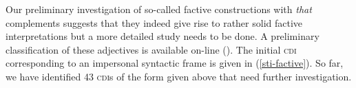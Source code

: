 \documentclass[10pt]{article}
\begin{document}
Our preliminary investigation of so-called factive constructions with \textit{that} complements suggests that 
they indeed give rise to rather solid factive interpretations but a more detailed study needs to be done.  A preliminary classification of these adjectives is available on-line (\cite{faust-adj-pol-lex}). The initial \textsc{cdi} corresponding to an impersonal syntactic frame is given in (\ref{sti-factive}).
\vspace{-0.6em}
\vspace{-0.6em}
So far, we have identified 43 \textsc{cdi}s of the form given above that need further investigation. 
\vspace{-0.5em}
%
%
%
%
\end{document}

